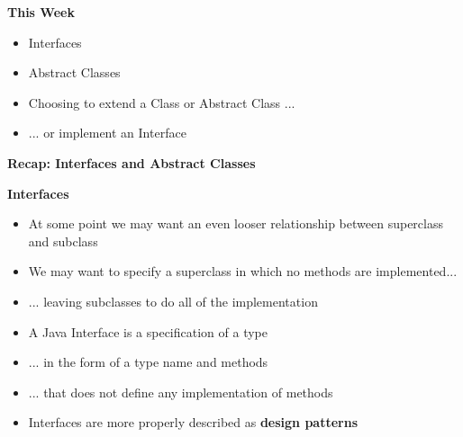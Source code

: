 \documentclass{beamer}
\begin{document}

\begin{frame}
\begin{center}
\textbf{This Week}
\end{center} 
\begin{itemize}
\item Interfaces 
\item Abstract Classes
\bigskip
\item Choosing to extend a Class or Abstract Class ...
\item ... or implement an Interface
\end{itemize}
\end{frame}

\begin{frame}
\begin{center}
\textbf{Recap: Interfaces and Abstract Classes}
\end{center}
\end{frame}

\begin{frame}
\begin{center}
\textbf{Interfaces}
\end{center}
\end{frame}


\begin{frame}
\begin{itemize}
\item At some point we may want an even looser relationship between superclass and subclass
\item We may want to specify a superclass in which no methods are implemented...
\item ... leaving subclasses to do all of the implementation
\end{itemize}
\end{frame}

\begin{frame}
\begin{itemize}
\item A Java Interface is a specification of a type 
\item ... in the form of a type name and methods 
\item ... that does not define any implementation of methods
\bigskip
\item Interfaces are more properly described as \textbf{design patterns}
\end{itemize}
\end{frame}
\end{document}
